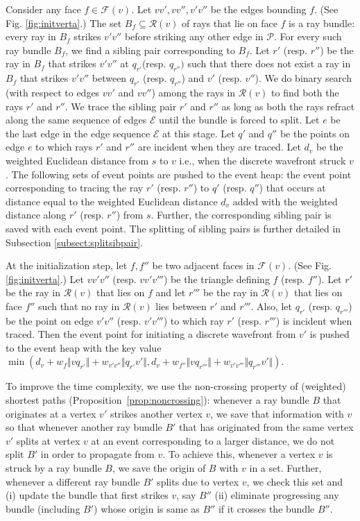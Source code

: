 \documentclass[11pt]{article}
\def\calP{\mathcal{P}}
\def\calR{\mathcal{R}}
\def\calF{\mathcal{F}}
\begin{document}
Consider any face $f \in \calF(v)$.
Let $vv', vv'', v'v''$ be the edges bounding $f$. 
(See Fig. \ref{fig:initverta}.)
The set $B_f \subseteq \calR(v)$ of rays that lie on face $f$ is a ray bundle:
every ray in $B_f$ strikes $v'v''$ before striking any other edge in $\calP$.
For every such ray bundle $B_f$, we find a sibling pair corresponding to $B_f$.
Let $r'$ (resp. $r''$) be the ray in $B_f$ that strikes $v'v''$ at $q_{r'}$(resp. $q_{r''})$ such that there does not exist a ray in $B_f$ that strikes $v'v''$ between $q_{r'}$ (resp. $q_{r''}$) and $v'$ (resp. $v''$).
We do binary search (with respect to edges $vv'$ and $vv''$) among the rays in $\calR(v)$ to find both the rays $r'$ and $r''$. We trace the sibling pair $r'$ and $r''$ as long as both the rays refract along the same sequence of edges $\mathcal{E}$ until the bundle is forced to split.
Let $e$ be the last edge in the edge sequence $\mathcal{E}$ at this stage.
Let $q'$ and $q''$ be the points on edge $e$ to which rays $r'$ and $r''$ are incident when they are traced.
Let $d_v$ be the weighted Euclidean distance from $s$ to $v$ i.e., when the discrete wavefront struck $v$.
The following sets of event points are pushed to the event heap:
the event point corresponding to tracing the ray $r'$ (resp. $r''$) to $q'$ (resp. $q''$) that occurs at distance equal to the weighted Euclidean distance $d_v$ added with the weighted distance along $r'$ (resp. $r''$) from $s$.
Further, the corresponding sibling pair is saved with each event point.
The splitting of sibling pairs is further detailed in Subsection \ref{subsect:splitsibpair}.

At the initialization step, let $f, f''$ be two adjacent faces in $\calF(v)$.
(See Fig. \ref{fig:initverta}.)
Let $vv'v''$ (resp. $vv'v'''$) be the triangle defining $f$ (resp. $f''$).
Let $r'$ be the ray in $\calR(v)$ that lies on $f$ and let $r'''$ be the ray in $\calR(v)$ that lies on face $f''$ such that no ray in $\calR(v)$ lies between $r'$ and $r'''$.
Also, let $q_{r'}$ (resp. $q_{r'''}$) be the point on edge $v'v''$ (resp. $v'v'''$) to which ray $r'$ (resp. $r'''$) is incident when traced.
Then the event point for initiating a discrete wavefront from $v'$ is pushed to the event heap with the key value $\min(d_v + w_{f} \Vert vq_{r'} \Vert + w_{v'v''} \Vert q_{r'}v' \Vert, d_v + w_{f''} \Vert vq_{r'''} \Vert + w_{v'v'''} \Vert q_{r'''}v' \Vert)$.

To improve the time complexity, we use the non-crossing property of (weighted) shortest paths (Proposition~\ref{prop:noncrossing}): whenever a ray bundle $B$ that originates at a vertex $v'$ strikes another vertex $v$, we save that information with $v$ so that whenever another ray bundle $B'$ that has originated from the same vertex $v'$ splits at vertex $v$ at an event corresponding to a larger distance, we do not split $B'$ in order to propagate from $v$.
To achieve this, whenever a vertex $v$ is struck by a ray bundle $B$, we save the origin of $B$ with $v$ in a set.
Further, whenever a different ray bundle $B'$ splits due to vertex $v$, we check this set and (i) update the bundle that first strikes $v$, say $B''$ (ii) eliminate progressing any bundle (including $B'$) whose origin is same as $B''$ if it crosses the bundle $B''$.
\end{document}
